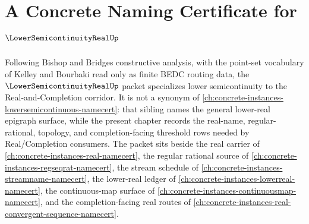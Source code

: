 \chapter{A Concrete Naming Certificate for $\LowerSemicontinuityRealUp$}
\label{ch:concrete-instances-lower-semicontinuity-real-namecert}

Following Bishop and Bridges constructive analysis, with the point-set
vocabulary of Kelley and Bourbaki read only as finite BEDC routing data, the
$\LowerSemicontinuityRealUp$ packet specializes lower semicontinuity to the
Real-and-Completion corridor. It is not a synonym of
\autoref{ch:concrete-instances-lowersemicontinuous-namecert}: that sibling
names the general lower-real epigraph surface, while the present chapter
records the real-name, regular-rational, topology, and completion-facing
threshold rows needed by Real/Completion consumers. The packet sits beside the
real carrier of \autoref{ch:concrete-instances-real-namecert}, the regular
rational source of \autoref{ch:concrete-instances-regseqrat-namecert}, the
stream schedule of \autoref{ch:concrete-instances-streamname-namecert}, the
lower-real ledger of \autoref{ch:concrete-instances-lowerreal-namecert}, the
continuous-map surface of \autoref{ch:concrete-instances-continuousmap-namecert},
and the completion-facing real routes of
\autoref{ch:concrete-instances-real-convergent-sequence-namecert}.

